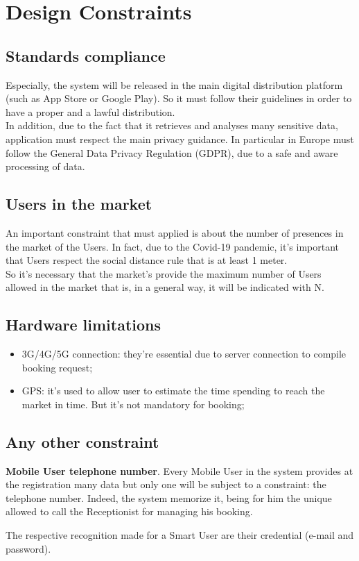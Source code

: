 \section{Design Constraints}
\subsection{Standards compliance}
Especially, the system will be released in the main digital distribution platform (such as App Store or Google Play). So it must follow their guidelines in order to have a proper and a lawful distribution. \\
In addition, due to the fact that it retrieves and analyses many sensitive data, application must respect the main privacy guidance. In particular in Europe must follow the General Data Privacy Regulation (GDPR), due to a safe and aware processing of data. 
\par
\subsection{Users in the market}
An important constraint that must applied is about the number of presences in the market of the Users. In fact, due to the Covid-19 pandemic, it's important that Users respect the social distance rule that is at least 1 meter.\\
So it's necessary that the market's provide the maximum number of Users allowed in the market that is, in a general way, it will be indicated with N.
\par
\subsection{Hardware limitations}
\begin{itemize}
\item 3G/4G/5G connection: they're essential due to server connection to compile booking request;
\item GPS: it's used to allow user to estimate the time spending to reach the market in time. But it's not mandatory for booking;
\end{itemize}
\subsection{Any other constraint}
\textbf{Mobile User telephone number}. Every Mobile User in the system provides at the registration many data but only one will be subject to a constraint: the telephone number. Indeed, the system memorize it, being for him the unique allowed to call the Receptionist for managing his booking. \par
The respective recognition made for a Smart User are their credential (e-mail and password).

